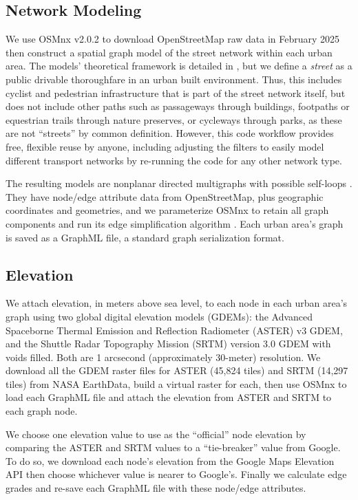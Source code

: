 \documentclass[12pt,letterpaper]{article} %
\begin{document}
\subsection{Network Modeling}

We use OSMnx v2.0.2 to download OpenStreetMap raw data in February 2025 then construct a spatial graph model of the street network within each urban area. The models' theoretical framework is detailed in \citet{boeing_topological_2025}, but we define a \textit{street} as a public drivable thoroughfare in an urban built environment. Thus, this includes cyclist and pedestrian infrastructure that is part of the street network itself, but does not include other paths such as passageways through buildings, footpaths or equestrian trails through nature preserves, or cycleways through parks, as these are not \enquote{streets} by common definition. However, this code workflow provides free, flexible reuse by anyone, including adjusting the filters to easily model different transport networks by re-running the code for any other network type.

The resulting models are nonplanar directed multigraphs with possible self-loops \citep{boeing_modeling_2025}. They have node/edge attribute data from OpenStreetMap, plus geographic coordinates and geometries, and we parameterize OSMnx to retain all graph components and run its edge simplification algorithm \citep{boeing_topological_2025}. Each urban area's graph is saved as a GraphML file, a standard graph serialization format.

\subsection{Elevation}

We attach elevation, in meters above sea level, to each node in each urban area's graph using two global digital elevation models (GDEMs): the Advanced Spaceborne Thermal Emission and Reflection Radiometer (ASTER) v3 GDEM, and the Shuttle Radar Topography Mission (SRTM) version 3.0 GDEM with voids filled. Both are 1 arcsecond (approximately 30-meter) resolution. We download all the GDEM raster files for ASTER (45,824 tiles) and SRTM (14,297 tiles) from NASA EarthData, build a virtual raster for each, then use OSMnx to load each GraphML file and attach the elevation from ASTER and SRTM to each graph node.

We choose one elevation value to use as the \enquote{official} node elevation by comparing the ASTER and SRTM values to a \enquote{tie-breaker} value from Google. To do so, we download each node's elevation from the Google Maps Elevation API then choose whichever value is nearer to Google's. Finally we calculate edge grades and re-save each GraphML file with these node/edge attributes.
\end{document}
